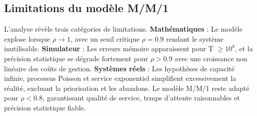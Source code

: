 \documentclass[12pt,a4paper]{article}
\begin{document}
\subsection{Limitations du modèle M/M/1}

L'analyse révèle trois catégories de limitations. \textbf{Mathématiques} : Le modèle explose lorsque $\rho \to 1$, avec un seuil critique $\rho=0.9$ rendant le système inutilisable. \textbf{Simulateur} : Les erreurs mémoire apparaissent pour T $\geq 10^8$, et la précision statistique se dégrade fortement pour $\rho > 0.9$ avec une croissance non linéaire des coûts de gestion. \textbf{Systèmes réels} : Les hypothèses de capacité infinie, processus Poisson et service exponentiel simplifient excessivement la réalité, excluant la priorisation et les abandons. Le modèle M/M/1 reste adapté pour $\rho < 0.8$, garantissant qualité de service, temps d'attente raisonnables et précision statistique fiable.
\end{document}
